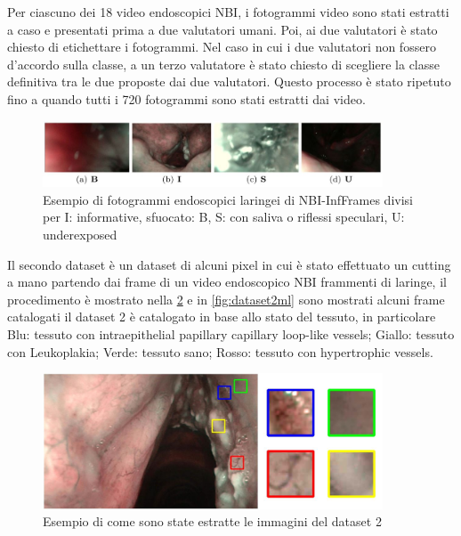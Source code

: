 Per ciascuno dei 18 video endoscopici NBI, i fotogrammi video sono stati estratti a caso e
presentati prima a due valutatori umani. Poi, ai due valutatori è stato chiesto di etichettare i fotogrammi. Nel caso in cui i due
valutatori non fossero d'accordo sulla classe, a un terzo valutatore è stato
chiesto di scegliere la classe definitiva tra le due proposte
dai due valutatori. Questo processo è stato ripetuto fino a quando tutti i
720 fotogrammi sono stati estratti dai video.

\begin{figure}[ht]
    \centering
    \includegraphics[width=0.9\textwidth]{introduzione/Larynge.jpg}
    \caption{Esempio di fotogrammi endoscopici laringei di NBI-InfFrames divisi per I: informative, sfuocato: B, S: con
    saliva o riflessi speculari,
    U: underexposed}
    \label{fig:larynges}
\end{figure}

Il secondo dataset è un dataset di alcuni pixel in cui è stato effettuato un cutting a mano partendo dai frame di  un video endoscopico NBI frammenti di laringe, il procedimento è mostrato nella \cref{fig:dataset2}  e in \cref{fig:dataset2ml} sono mostrati alcuni frame catalogati il dataset 2 è catalogato in base allo stato del tessuto, in particolare Blu: tessuto con intraepithelial papillary capillary loop-like vessels; Giallo: tessuto con Leukoplakia;
Verde: tessuto sano; Rosso: tessuto con hypertrophic vessels\cite{moccia_larynge}.

\begin{figure}[ht]
    \centering
    \includegraphics[width=0.9\textwidth]{introduzione/dataset-2.JPG}
    \caption{Esempio di come sono state estratte le immagini del dataset 2}
    \label{fig:dataset2}
\end{figure}

